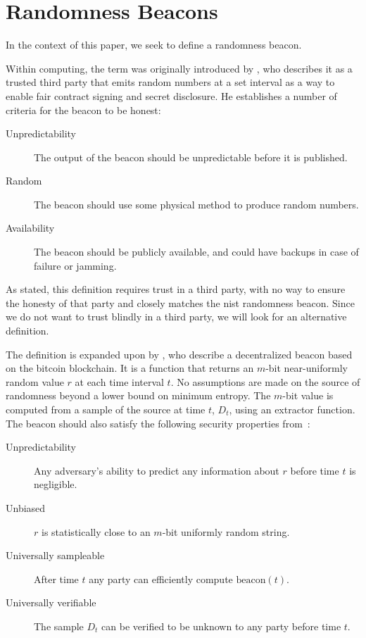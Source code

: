 \section{Randomness Beacons}

In the context of this paper, we seek to define a randomness beacon.

Within computing, the term was originally introduced by \citet{rabin1983transaction}, who describes it as a trusted third party that emits random numbers at a set interval as a way to enable fair contract signing and secret disclosure.
He establishes a number of criteria for the beacon to be honest:

\begin{description}
    \item[Unpredictability] The output of the beacon should be unpredictable before it is published.
    \item[Random] The beacon should use some physical method to produce random numbers.
    \item[Availability] The beacon should be publicly available, and could have backups in case of failure or jamming.
\end{description}

As stated, this definition requires trust in a third party, with no way to ensure the honesty of that party and closely matches the \gls{nist} randomness beacon.
Since we do not want to trust blindly in a third party, we will look for an alternative definition.

The definition is expanded upon by \citet{bonneau2015bitcoin}, who describe a decentralized beacon based on the bitcoin blockchain.
It is a function that returns an $m$-bit near-uniformly random value $r$ at each time interval $t$.
No assumptions are made on the source of randomness beyond a lower bound on minimum entropy.
The $m$-bit value is computed from a sample of the source at time $t$, $D_t$, using an extractor function.
The beacon should also satisfy the following security properties from~\cite{bonneau2015bitcoin}:

\begin{description}
    \item[Unpredictability] Any adversary's ability to predict any information about $r$ before time $t$ is negligible.
    \item[Unbiased] $r$ is statistically close to an $m$-bit uniformly random string.
    \item[Universally sampleable] After time $t$ any party can efficiently compute $\text{beacon}(t)$.
    \item[Universally verifiable] The sample $D_t$ can be verified to be unknown to any party before time $t$.
\end{description}

